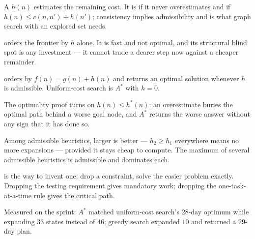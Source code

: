 \begin{chaptersummary}
\begin{tight}
  \item A  $h(n)$ estimates the remaining cost. It is
         if it never overestimates and  if
        $h(n) \le c(n,n') + h(n')$; consistency implies admissibility and is what
        graph search with an explored set needs.
  \item {} orders the frontier by $h$ alone. It is
        fast and not optimal, and its structural blind spot is any investment ---
        it cannot trade a dearer step now against a cheaper remainder.
  \item {} orders by $f(n) = g(n) + h(n)$ and returns an optimal
        solution whenever $h$ is admissible. Uniform-cost search is $A^{*}$ with
        $h=0$.
  \item The optimality proof turns on $h(n) \le h^{*}(n)$: an overestimate buries
        the optimal path behind a worse goal node, and $A^{*}$ returns the worse
        answer without any sign that it has done so.
  \item Among admissible heuristics, larger is better --- $h_{2} \ge h_{1}$
        everywhere means no more expansions --- provided it stays cheap to compute.
        The maximum of several admissible heuristics is admissible and dominates
        each.
  \item {} is the way to invent one: drop a constraint, solve the
        easier problem exactly. Dropping the testing requirement gives mandatory
        work; dropping the one-task-at-a-time rule gives the critical path.
  \item Measured on the sprint: $A^{*}$ matched uniform-cost search's $28$-day
        optimum while expanding $33$ states instead of $46$; greedy search expanded
        $10$ and returned a $29$-day plan.
\end{tight}
\end{chaptersummary}

